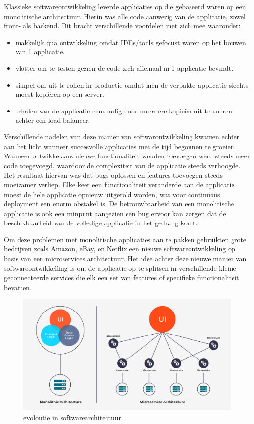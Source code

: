 Klassieke softwareontwikkeling leverde applicaties op die gebaseerd waren op een monolitische architectuur. Hierin was alle code aanwezig van de applicatie, zowel front- als backend. 
Dit bracht verschillende voordelen met zich mee waaronder:
\begin{itemize}
    \item makkelijk qua ontwikkeling omdat IDEs/tools gefocust waren op het bouwen van 1 applicatie.
    \item vlotter om te testen gezien de code zich allemaal in 1 applicatie bevindt. 
    \item simpel om uit te rollen in productie omdat men de verpakte applicatie slechts moest kopiëren op een server. 
    \item schalen van de applicatie eenvoudig door meerdere kopieën uit te voeren achter een load balancer.
\end{itemize} 

Verschillende nadelen van deze manier van softwarontwikkeling kwamen echter aan het licht wanneer succesvolle applicaties met de tijd begonnen te groeien. Wanneer ontwikkelaars nieuwe functionaliteit wouden toevoegen werd steeds meer code toegevoegd, waardoor de complexiteit van de applicatie steeds verhoogde. Het resultaat hiervan was dat bugs oplossen en features toevoegen steeds moeizamer verliep. Elke keer een functionaliteit veranderde aan de applicatie moest de hele applicatie opnieuw uitgerold worden, wat voor continuous deployment een enorm obstakel is.
De betrouwbaarheid van een monolitische applicatie is ook een minpunt aangezien een bug ervoor kan zorgen dat de beschikbaarheid van de volledige applicatie in het gedrang komt. \autocite{Richardson2015}

Om deze problemen met monolitische applicaties aan te pakken gebruikten grote bedrijven zoals Amazon, eBay, en Netflix een nieuwe softwareontwikkeling op basis van een microservices architectuur. Het idee achter deze nieuwe manier van softwareontwikkelling is om de applicatie op te splitsen in verschillende kleine geconnecteerde services die elk een set van features of specifieke functionaliteit bevatten.

\begin{figure}[h]
    \centering
    \includegraphics[scale=.1]{img/monolithic_vs_microservices.png}
    \caption{evoloutie in softwarearchitectuur \autocite{Sanjaya2020}}
    \label{softwarearchitectuur}
\end{figure}

